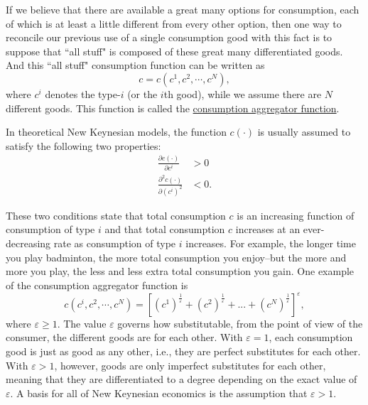 \documentclass[10pt]{article}
\begin{document}
If we believe that there are available a great many options for consumption, each of which is at
least a little different from every other option, then one way to reconcile our previous use of a 
single consumption good with this fact is to suppose that ``all stuff" is composed of these great
many differentiated goods. And this ``all stuff" consumption function can be written as
\begin{equation*}
c = c(c^{1}, c^{2}, \cdots, c^{N}),
\end{equation*}
where $ c^{i} $ denotes the type-$ i $ (or the $ i $th good), while we assume there are $ N $ 
different goods. This function is called the {\underline {consumption aggregator function}}.

In theoretical New Keynesian models, the function $ c(\cdot) $ is usually assumed to satisfy
the following two properties:
\begin{align*}
\frac{\partial c(\cdot ) }{\partial c^{i} } &> 0\\
\frac{\partial^{2} c(\cdot ) }{\partial (c^{i})^{2} } &< 0.
\end{align*}

These two conditions state that total consumption $ c $ is an increasing function of consumption
of type $ i $ and that total consumption $ c $ increases at an ever-decreasing rate as consumption
of type $ i $ increases. For example, the longer time you play badminton, the more total consumption
you enjoy--but the more and more you play, the less and less extra total consumption you gain.
One example of the consumption aggregator function is
\begin{equation*}
c(c^{i}, c^{2}, \cdots, c^{N}) = 
\left[ 
		(c^{1})^{\frac{1}{\varepsilon}} + (c^{2})^{\frac{1}{\varepsilon}} + ... + 
		(c^{N})^{\frac{1}{\varepsilon}}
\right] ^{\varepsilon},
\end{equation*}
where $ \varepsilon \ge 1 $. The value $ \varepsilon $ governs how substitutable, from the point of
view of the consumer, the different goods are for each other. With $ \varepsilon = 1 $, each
consumption good is just as good as any other, i.e., they are perfect substitutes for each other.
With $ \varepsilon > 1 $, however, goods are only imperfect substitutes for each other, 
meaning that they are differentiated to a degree depending on the exact value of $ \varepsilon $.
A basis for all of New Keynesian economics is the assumption that $ \varepsilon > 1 $.
\\
\end{document}
